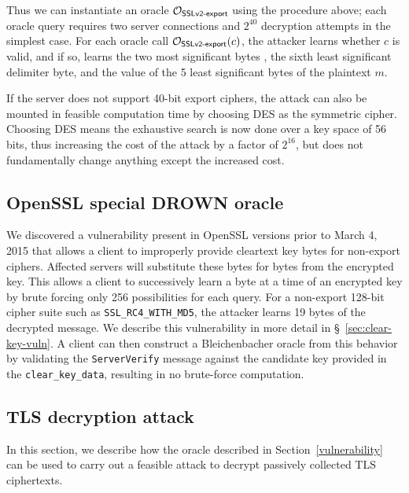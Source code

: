 Thus we can instantiate an oracle $\mathcal{O}_\textsf{SSLv2-export}$ using the procedure above; each oracle query requires two server connections and $2^{40}$ decryption attempts in the simplest case.  For each oracle call $\mathcal{O}_\textsf{SSLv2-export}(c)$, the attacker learns whether $c$ is valid, and if so, learns the two most significant bytes , the sixth least significant  delimiter byte, and the value of the 5 least significant bytes of the plaintext $m$.

\ifext
If the server does not support 40-bit export ciphers, the attack can also be mounted in feasible computation time by choosing DES as the symmetric cipher.  Choosing DES means the exhaustive search is now done over a key space of 56 bits, thus increasing the cost of the attack by a factor of \begin{math} 2^{16} \end{math}, but does not fundamentally change anything except the increased cost.
\fi

\ifsubmit\relax\else
\subsection{OpenSSL special DROWN oracle}

We discovered a vulnerability present in OpenSSL versions prior to March 4, 2015 that allows a client to improperly provide cleartext key bytes for non-export ciphers.  Affected servers will substitute these bytes for bytes from the encrypted key.  This allows a client to successively learn a byte at a time of an encrypted key by brute forcing only 256 possibilities for each query. For a non-export 128-bit cipher suite such as \texttt{SSL\_RC4\_WITH\_MD5}, the attacker learns 19 bytes of the decrypted message.  We describe this vulnerability in more detail in \S~\ref{sec:clear-key-vuln}.  A client can then construct a Bleichenbacher oracle from this behavior by validating the \texttt{ServerVerify} message against the candidate key provided in the \texttt{clear\_key\_data}, resulting in no brute-force computation.
\fi

\subsection{TLS decryption attack}
\label{sec:bb-performance}

In this section, we describe how the oracle described in Section~\ref{vulnerability} can be used to carry out a feasible attack to decrypt passively collected TLS ciphertexts.

